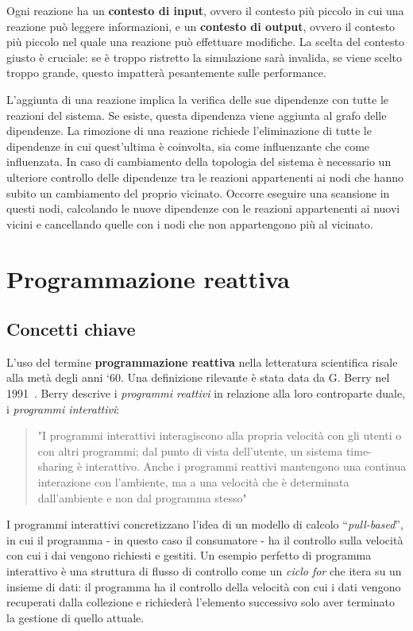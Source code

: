 \documentclass[12pt,a4paper,openright,twoside]{book}
\begin{document}
Ogni reazione ha un \textbf{contesto di input}, ovvero il contesto più piccolo in cui una reazione può leggere informazioni, e un \textbf{contesto di output}, ovvero il contesto più piccolo nel quale una reazione può effettuare modifiche. 
La scelta del contesto giusto è cruciale: se è troppo ristretto la simulazione sarà invalida, se viene scelto troppo grande, questo impatterà pesantemente sulle performance. 

L'aggiunta di una reazione implica la verifica delle sue dipendenze con tutte le reazioni del sistema. Se esiste, questa dipendenza viene aggiunta al grafo delle dipendenze. La rimozione di una reazione richiede l'eliminazione di tutte le dipendenze in cui quest'ultima è coinvolta, sia come influenzante che come influenzata. 
In caso di cambiamento della topologia del sistema è necessario un ulteriore controllo delle dipendenze tra le reazioni appartenenti ai nodi che hanno subito un cambiamento del proprio vicinato. Occorre eseguire una scansione in questi nodi, calcolando le nuove dipendenze con le reazioni appartenenti ai nuovi vicini e cancellando quelle con i nodi che non appartengono più al vicinato.

\chapter{Programmazione reattiva}
\section{Concetti chiave}
L'uso del termine \textbf{programmazione reattiva} nella letteratura scientifica risale alla metà degli anni `60. Una definizione rilevante è stata data da G. Berry nel 1991~\cite{DBLP:journals/pieee/BenvenisteB91}. Berry descrive i \textit{programmi reattivi} in relazione alla loro controparte duale, i \textit{programmi interattivi}: 
\begin{quotation}
    "I programmi interattivi interagiscono alla propria velocità con gli utenti o con altri programmi; dal punto di vista dell'utente, un sistema time-sharing è interattivo. Anche i programmi reattivi mantengono una continua interazione con l'ambiente, ma a una velocità che è determinata dall'ambiente e non dal programma stesso"
\end{quotation}
I programmi interattivi concretizzano l'idea di un modello di calcolo ``\textit{pull-based}'', in cui il programma - in questo caso il consumatore - ha il controllo sulla velocità con cui i dai vengono richiesti e gestiti. 
Un esempio perfetto di programma interattivo è una struttura di flusso di controllo come un \textit{ciclo for} che itera su un insieme di dati: il programma ha il controllo della velocità con cui i dati vengono recuperati dalla collezione e richiederà l'elemento successivo solo aver terminato la gestione di quello attuale. 
\end{document}

